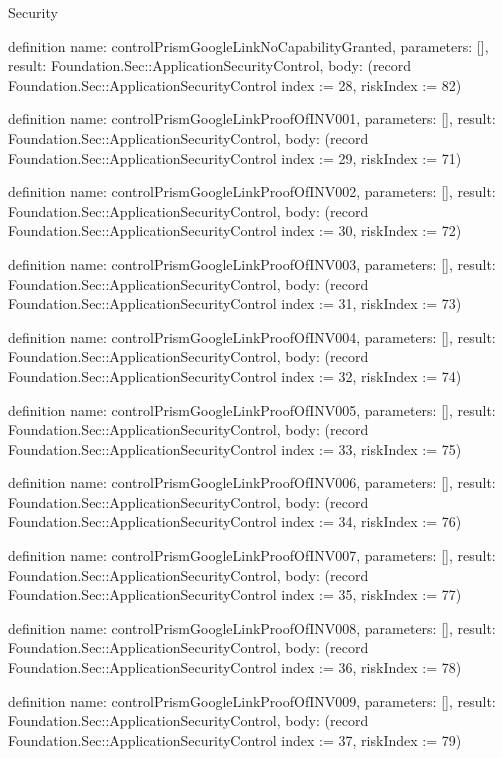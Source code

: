 \begin{lexlean}{Security}
\begin{semanticmodule}
definition{
  name: controlPrismGoogleLinkNoCapabilityGranted,
  parameters: [],
  result: Foundation.Sec::ApplicationSecurityControl,
  body: (record Foundation.Sec::ApplicationSecurityControl {index := 28, riskIndex := 82})
}

definition{
  name: controlPrismGoogleLinkProofOfINV001,
  parameters: [],
  result: Foundation.Sec::ApplicationSecurityControl,
  body: (record Foundation.Sec::ApplicationSecurityControl {index := 29, riskIndex := 71})
}

definition{
  name: controlPrismGoogleLinkProofOfINV002,
  parameters: [],
  result: Foundation.Sec::ApplicationSecurityControl,
  body: (record Foundation.Sec::ApplicationSecurityControl {index := 30, riskIndex := 72})
}

definition{
  name: controlPrismGoogleLinkProofOfINV003,
  parameters: [],
  result: Foundation.Sec::ApplicationSecurityControl,
  body: (record Foundation.Sec::ApplicationSecurityControl {index := 31, riskIndex := 73})
}

definition{
  name: controlPrismGoogleLinkProofOfINV004,
  parameters: [],
  result: Foundation.Sec::ApplicationSecurityControl,
  body: (record Foundation.Sec::ApplicationSecurityControl {index := 32, riskIndex := 74})
}

definition{
  name: controlPrismGoogleLinkProofOfINV005,
  parameters: [],
  result: Foundation.Sec::ApplicationSecurityControl,
  body: (record Foundation.Sec::ApplicationSecurityControl {index := 33, riskIndex := 75})
}

definition{
  name: controlPrismGoogleLinkProofOfINV006,
  parameters: [],
  result: Foundation.Sec::ApplicationSecurityControl,
  body: (record Foundation.Sec::ApplicationSecurityControl {index := 34, riskIndex := 76})
}

definition{
  name: controlPrismGoogleLinkProofOfINV007,
  parameters: [],
  result: Foundation.Sec::ApplicationSecurityControl,
  body: (record Foundation.Sec::ApplicationSecurityControl {index := 35, riskIndex := 77})
}

definition{
  name: controlPrismGoogleLinkProofOfINV008,
  parameters: [],
  result: Foundation.Sec::ApplicationSecurityControl,
  body: (record Foundation.Sec::ApplicationSecurityControl {index := 36, riskIndex := 78})
}

definition{
  name: controlPrismGoogleLinkProofOfINV009,
  parameters: [],
  result: Foundation.Sec::ApplicationSecurityControl,
  body: (record Foundation.Sec::ApplicationSecurityControl {index := 37, riskIndex := 79})
}


\end{semanticmodule}
\end{lexlean}
